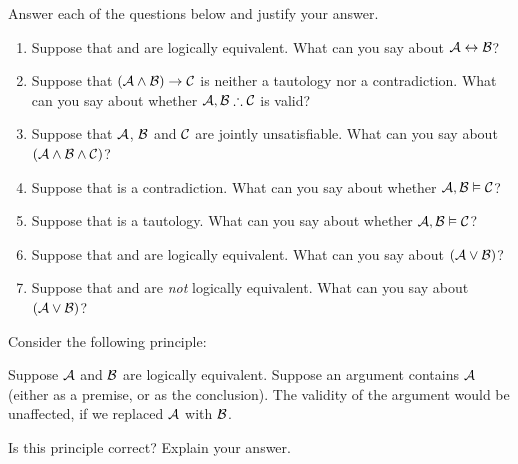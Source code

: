 \problempart
\label{pr.TT.concepts}
Answer each of the questions below and justify your answer.
\begin{enumerate}
\item Suppose that  and  are logically equivalent. What can you say about $\mathcal{A}\leftrightarrow\mathcal{B}$?
\item Suppose that $(\mathcal{A}\wedge\mathcal{B})\rightarrow\mathcal{C}$ is neither a tautology nor a contradiction. What can you say about whether $\metav{A}, \metav{B} \therefore\metav{C}$ is valid?
\item Suppose that $\mathcal{A}$, $\mathcal{B}$ and $\mathcal{C}$  are jointly unsatisfiable. What can you say about $(\mathcal{A}\wedge\mathcal{B}\wedge\mathcal{C})$?
\item Suppose that  is a contradiction. What can you say about whether $\mathcal{A}, \mathcal{B} \vDash \mathcal{C}$?
\item Suppose that  is a tautology. What can you say about whether $\mathcal{A}, \mathcal{B}\vDash \mathcal{C}$?
\item Suppose that  and  are logically equivalent. What can you say about $(\mathcal{A}\vee\mathcal{B})$?
\item Suppose that  and  are \emph{not} logically equivalent. What can you say about $(\mathcal{A}\vee\mathcal{B})$?
\end{enumerate}
\problempart 
Consider the following principle:
	\begin{ebullet}
		\item Suppose $\mathcal{A}$ and $\mathcal{B}$ are logically equivalent. Suppose an argument contains $\mathcal{A}$ (either as a premise, or as the conclusion). The validity of the argument would be unaffected, if we replaced $\mathcal{A}$ with $\mathcal{B}$.
	\end{ebullet}
Is this principle correct? Explain your answer.

